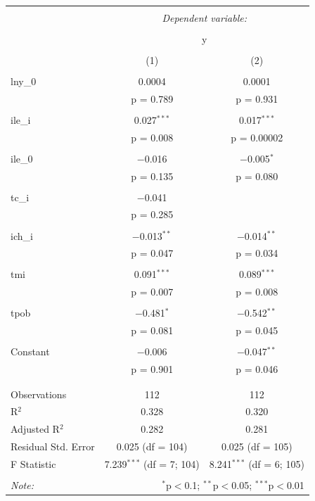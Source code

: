 \begin{table}[!htbp] \centering 
    \tiny
  \caption{} 
  \label{} 
\begin{tabular}{@{\extracolsep{5pt}}lcc} 
\\[-1.8ex]\hline 
\hline \\[-1.8ex] 
 & \multicolumn{2}{c}{\textit{Dependent variable:}} \\ 
\cline{2-3} 
\\[-1.8ex] & \multicolumn{2}{c}{y} \\ 
\\[-1.8ex] & (1) & (2)\\ 
\hline \\[-1.8ex] 
 lny\_0 & 0.0004 & 0.0001 \\ 
  & p = 0.789 & p = 0.931 \\ 
  & & \\ 
 ile\_i & 0.027$^{***}$ & 0.017$^{***}$ \\ 
  & p = 0.008 & p = 0.00002 \\ 
  & & \\ 
 ile\_0 & $-$0.016 & $-$0.005$^{*}$ \\ 
  & p = 0.135 & p = 0.080 \\ 
  & & \\ 
 tc\_i & $-$0.041 &  \\ 
  & p = 0.285 &  \\ 
  & & \\ 
 ich\_i & $-$0.013$^{**}$ & $-$0.014$^{**}$ \\ 
  & p = 0.047 & p = 0.034 \\ 
  & & \\ 
 tmi & 0.091$^{***}$ & 0.089$^{***}$ \\ 
  & p = 0.007 & p = 0.008 \\ 
  & & \\ 
 tpob & $-$0.481$^{*}$ & $-$0.542$^{**}$ \\ 
  & p = 0.081 & p = 0.045 \\ 
  & & \\ 
 Constant & $-$0.006 & $-$0.047$^{**}$ \\ 
  & p = 0.901 & p = 0.046 \\ 
  & & \\ 
\hline \\[-1.8ex] 
Observations & 112 & 112 \\ 
R$^{2}$ & 0.328 & 0.320 \\ 
Adjusted R$^{2}$ & 0.282 & 0.281 \\ 
Residual Std. Error & 0.025 (df = 104) & 0.025 (df = 105) \\ 
F Statistic & 7.239$^{***}$ (df = 7; 104) & 8.241$^{***}$ (df = 6; 105) \\ 
\hline 
\hline \\[-1.8ex] 
\textit{Note:}  & \multicolumn{2}{r}{$^{*}$p$<$0.1; $^{**}$p$<$0.05; $^{***}$p$<$0.01} \\ 
\end{tabular} 
\end{table} 


